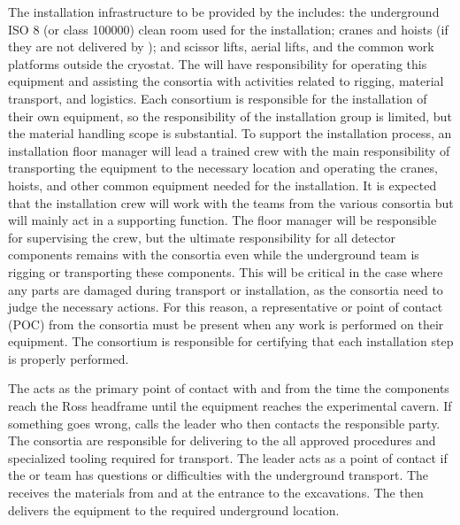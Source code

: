 The installation infrastructure to be provided by the 
includes: the underground ISO 8 (or class \num{100000}) clean room
used for the installation; cranes and hoists (if they are not
delivered by ); and scissor lifts, aerial lifts, and the common
work platforms outside the cryostat. The  will have
responsibility for operating this equipment and assisting the
consortia with activities related to rigging, material transport, and
logistics. Each consortium is responsible for the installation of
their own equipment, so the responsibility of the installation group is
limited, but the material handling scope is substantial. To support
the installation process, an installation floor manager will lead a
trained crew with the main responsibility of transporting the
equipment to the necessary location and operating the cranes, hoists,
and other common equipment needed for the installation. It is expected
that the installation crew will work with the teams from the various
consortia but will mainly act in a supporting function. The
 floor manager will be responsible for supervising the
 crew, but the ultimate responsibility for all detector
components remains with the consortia even while the underground
team is rigging or transporting these components.  This will be
critical in the case where any parts are damaged during transport or installation,
as the consortia need to judge the necessary actions. 
For this reason,
a representative or point of contact (POC) from the consortia must be
present when any work is performed on their equipment. The consortium
is responsible for certifying that each installation step is properly
performed.

The  acts as the primary point of contact with
 and \surf from the time the components reach the Ross
headframe until the equipment reaches the experimental cavern. If
something goes wrong, \surf calls the  leader who then
contacts the responsible party. The consortia are responsible for
delivering to the  all approved procedures and specialized
tooling required for transport. The  leader acts as a point
of contact if the  or \surf team has questions or difficulties
with the underground transport.  The  receives the
materials from  and \surf at the entrance to the 
excavations. The  then delivers the equipment to the
required underground location.

